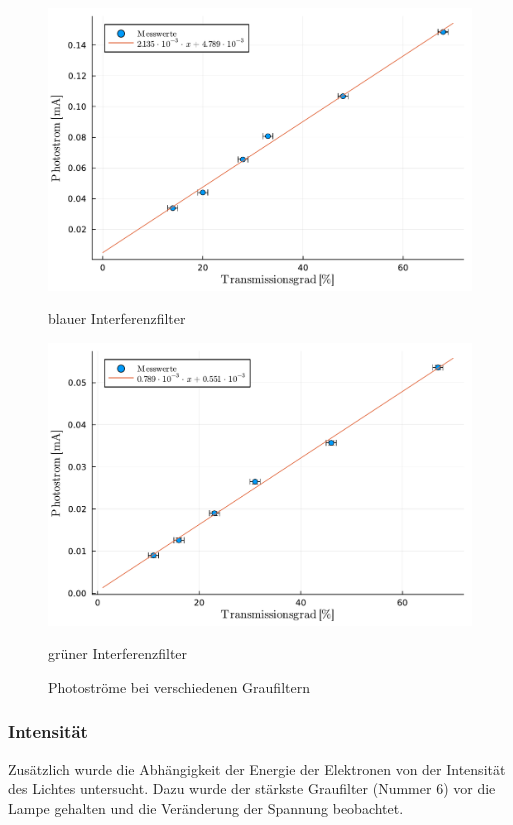 \documentclass[12pt,a4paper]{scrartcl}
\numberwithin{equation}{section} %
\begin{document}
\begin{figure}[h!]
	\begin{minipage}{0.5\textwidth}
		\includegraphics[width=\textwidth]{../media/B1.4/Photostrom_blau.pdf}
		\caption*{blauer Interferenzfilter}
		\label{abb:Photostrom blau}
	\end{minipage}
	\begin{minipage}{0.5\textwidth}
		\includegraphics[width=\textwidth]{../media/B1.4/Photostrom_gruen.pdf}
		\caption*{grüner Interferenzfilter}
		\label{abb:Photostrom grün}
	\end{minipage}
	\caption{Photoströme bei verschiedenen Graufiltern}
	\label{abb:Photostrom fit}
\end{figure}

\subsubsection{Intensität}
Zusätzlich wurde die Abhängigkeit der Energie der Elektronen von der Intensität des Lichtes untersucht. Dazu wurde der stärkste Graufilter (Nummer $6$) vor die Lampe gehalten und die Veränderung der Spannung beobachtet.
\end{document}
